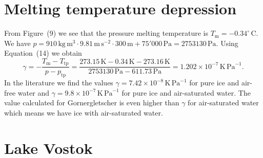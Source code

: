 \documentclass[DIV15,11pt,parskip=half]{scrartcl}
\newcommand{\cels}[1]{\ensuremath{#1^{\circ}\,\mathrm{C}}}
\begin{document}
\section{Melting temperature depression}

From Figure~(9) we see that the pressure melting temperature is $T_{\text{m}} = -\cels{0.34}$. We have $p = 910\,\text{kg}\,\text{m}^{3} \cdot 9.81\,\text{m}\,\text{s}^{-2}\cdot 300\,\text{m} + 75'000\,\text{Pa} = 2753130\,\text{Pa}$. Using Equation~(14) we obtain
  \begin{equation*}
    \gamma = -\frac{T_{\text{m}}-T_{\text{tp}}}{p - p_{\text{tp}}} = \frac{273.15\,\text{K} -0.34\,\text{K} -273.16\,\text{K}}{2753130\,\text{Pa} - 611.73\,\text{Pa}} = 1.202\times 10^{-7}\,\text{K}\,\text{Pa}^{-1}.
  \end{equation*} In the literature we find the values $\gamma = 7.42 \times 10^{-8} \,\text{K}\,\text{Pa}^{-1}$ for pure ice and air-free water and $\gamma = 9.8 \times 10^{-7} \,\text{K}\,\text{Pa}^{-1}$ for pure ice and air-saturated water. The value calculated for Gornergletscher is even higher than $\gamma$ for air-saturated water which means we have ice with air-saturated water.


\section{Lake Vostok}
\end{document}
